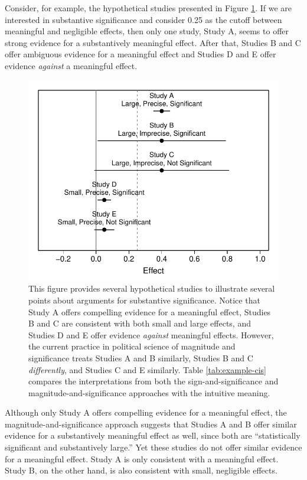 \documentclass[12pt]{article}
\begin{document}
Consider, for example, the hypothetical studies presented in Figure \ref{fig:example-cis}. If we are interested in substantive significance and consider 0.25 as the cutoff between meaningful and negligible effects, then only one study, Study A, seems to offer strong evidence for a substantively meaningful effect. After that, Studies B and C offer ambiguous evidence for a meaningful effect and Studies D and E offer evidence \emph{against} a meaningful effect.

\begin{figure}[H]
\begin{center}
\includegraphics[scale = .8]{figs/example-cis.pdf}
\caption{This figure provides several hypothetical studies to illustrate several points about arguments for substantive significance. Notice that Study A offers compelling evidence for a meaningful effect, Studies B and C are consistent with both small and large effects, and Studies D and E offer evidence \emph{against} meaningful effects. However, the current practice in political science of magnitude and significance treats Studies A and B similarly, Studies B and C \emph{differently}, and Studies C and E similarly. Table \ref{tab:example-cis} compares the interpretations from both the sign-and-significance and magnitude-and-significance approaches with the intuitive meaning.}\label{fig:example-cis}
\end{center}
\end{figure}

Although only Study A offers compelling evidence for a meaningful effect, the magnitude-and-significance approach suggests that Studies A and B offer similar evidence for a substantively meaningful effect as well, since both are ``statistically significant and substantively large.''  Yet these studies do not offer similar evidence for a meaningful effect. Study A is only consistent with a meaningful effect. Study B, on the other hand, is also consistent with small, negligible effects.
\end{document}
